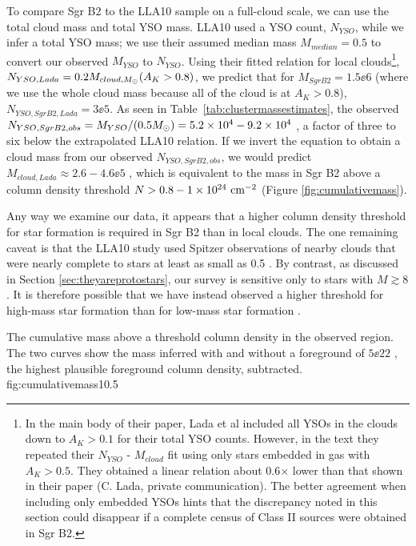 \documentclass[twocolumn]{aastex61}
\begin{document}
To compare Sgr B2 to the LLA10 sample on a full-cloud scale, we can use
the total cloud mass and total YSO mass.  LLA10 used a YSO count, $N_{YSO}$,
while we infer a total YSO mass; we use their assumed median mass $M_{median} =
0.5$ \msun to convert our observed $M_{YSO}$ to $N_{YSO}$.  Using their
fitted relation for local clouds\footnote{In the main body of their paper, Lada
et al included all YSOs in the clouds down to $A_K>0.1$ for their total YSO
counts.  However, in the text they repeated their $N_{YSO}$ - $M_{cloud}$ fit
using only stars embedded in gas with $A_K>0.5$.  They obtained a linear
relation about 0.6$\times$ lower than that shown in their paper (C. Lada,
private communication).  The better agreement when including only embedded
YSOs hints that the discrepancy noted in this section could disappear if a
complete census of Class II sources were obtained in Sgr B2.}, $N_{YSO,Lada} = 0.2
M_{cloud,M_{\odot}}(A_K>0.8)$, we
predict that for $M_{Sgr B2}=1.5\ee{6}$ \msun (where we use the whole cloud
mass because all of the cloud is at $A_K>0.8$), $N_{YSO,Sgr B2,Lada} =
3\ee{5}$.  As seen in Table~\ref{tab:clustermassestimates}, the observed
$N_{YSO,Sgr B2,obs} = M_{YSO} /
(0.5 M_{\odot}) = 5.2\times10^{4}-9.2\times10^{4}$ \msun, a factor of three to six below the
extrapolated LLA10 relation.  If we invert the equation to obtain a cloud
mass from our
observed $N_{YSO,Sgr B2,obs}$, we would predict $M_{cloud,Lada}\approx2.6-4.6\ee{5}$ 
\msun,
which is equivalent to the mass in Sgr B2 above a column density threshold
$N>0.8-1\times10^{24}~\textrm{cm}^{-2}$ (Figure \ref{fig:cumulativemass}).

Any way we examine our data, it appears that a higher column density threshold
for star formation is required in Sgr B2 than in local clouds.  The one
remaining caveat is that the LLA10 study  used Spitzer observations of nearby
clouds that were nearly complete to stars at least as small as 0.5 \msun.  By
contrast, as discussed in Section \ref{sec:theyareprotostars}, our survey is
sensitive only to stars with $M\gtrsim8$ \msun.  It is therefore possible that
we have instead observed a higher threshold for high-mass star formation than
for low-mass star formation \citep[e.g., as suggested by ][]{Krumholz2008a}.


{The cumulative mass above a threshold column density in the observed
region.  The two curves show the mass inferred with and without a
foreground of $5\ee{22}$ \persc, the highest plausible foreground column
density, subtracted.}
{fig:cumulativemass}{1}{0.5\textwidth}
\end{document}
